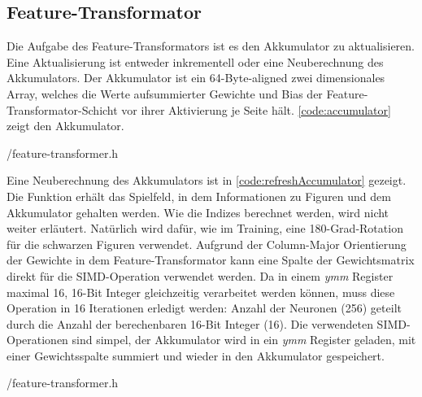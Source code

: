 \subsection{Feature-Transformator}

Die Aufgabe des Feature-Transformators ist es den Akkumulator zu aktualisieren. Eine Aktualisierung ist entweder inkrementell oder eine Neuberechnung des Akkumulators. Der Akkumulator ist ein 64-Byte-aligned zwei dimensionales Array, welches die Werte aufsummierter Gewichte und Bias der Feature-Transformator-Schicht vor ihrer Aktivierung je Seite hält. \autoref{code:accumulator} zeigt den Akkumulator.


{\srcloc/feature-transformer.h}

Eine Neuberechnung des Akkumulators ist in \autoref{code:refreshAccumulator} gezeigt. Die Funktion erhält das Spielfeld, in dem Informationen zu \zb{} Figuren und dem Akkumulator gehalten werden. Wie die Indizes berechnet werden, wird nicht weiter erläutert. Natürlich wird dafür, wie im Training, eine 180-Grad-Rotation für die schwarzen Figuren verwendet. Aufgrund der Column-Major Orientierung der Gewichte in dem Feature-Transformator kann eine Spalte der Gewichtsmatrix direkt für die \ac{SIMD}-Operation verwendet werden. Da in einem \emph{ymm} Register maximal 16, 16-Bit Integer gleichzeitig verarbeitet werden können, muss diese Operation in 16 Iterationen erledigt werden: Anzahl der Neuronen (256) geteilt durch die Anzahl der berechenbaren 16-Bit Integer (16). Die verwendeten \ac{SIMD}-Operationen sind simpel, der Akkumulator wird in ein \emph{ymm} Register geladen, mit einer Gewichtsspalte summiert und wieder in den Akkumulator gespeichert.


{\srcloc/feature-transformer.h}

